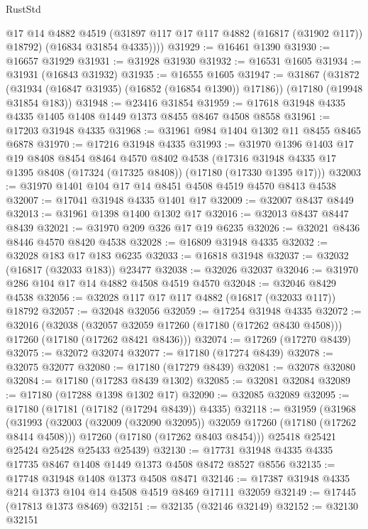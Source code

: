 \begin{lexlean}{RustStd}
\begin{coremodule}
{\begin{coremodule}
{{{{{{{{{{{{{{{{{{{{{{{{{{{{{{{{{{{{{{{{{{{{{{{{{{{{{{{          @17
          @14
          @4882
          @4519
          (@31897 @117 @17 @117 @4882 (@16817 (@31902 @117)) @18792)
          (@16834 @31854 @4335))))
@31929 := @16461 @1390
@31930 := @16657 @31929
@31931 := @31928 @31930
@31932 := @16531 @1605
@31934 := @31931 (@16843 @31932)
@31935 := @16555 @1605
@31947 := @31867
    (@31872 (@31934 (@16847 @31935) (@16852 (@16854 @1390)) @17186))
    (@17180 (@19948 @31854 @183))
@31948 := @23416 @31854
@31959 := @17618 @31948 @4335 @4335 @1405 @1408 @1449 @1373 @8455 @8467 @4508 @8558
@31961 := @17203 @31948 @4335
@31968 := @31961 @984 @1404 @1302 @11 @8455 @8465 @6878
@31970 := @17216 @31948 @4335
@31993 := @31970
    @1396
    @1403
    @17
    @19
    @8408
    @8454
    @8464
    @4570
    @8402
    @4538
    (@17316 @31948 @4335 @17 @1395 @8408 (@17324 (@17325 @8408)) (@17180 (@17330 @1395 @17)))
@32003 := @31970 @1401 @104 @17 @14 @8451 @4508 @4519 @4570 @8413 @4538
@32007 := @17041 @31948 @4335 @1401 @17
@32009 := @32007 @8437 @8449
@32013 := @31961 @1398 @1400 @1302 @17
@32016 := @32013 @8437 @8447 @8439
@32021 := @31970 @209 @326 @17 @19 @6235
@32026 := @32021 @8436 @8446 @4570 @8420 @4538
@32028 := @16809 @31948 @4335
@32032 := @32028 @183 @17 @183 @6235
@32033 := @16818 @31948
@32037 := @32032 (@16817 (@32033 @183)) @23477
@32038 := @32026 @32037
@32046 := @31970 @286 @104 @17 @14 @4882 @4508 @4519 @4570
@32048 := @32046 @8429 @4538
@32056 := @32028 @117 @17 @117 @4882 (@16817 (@32033 @117)) @18792
@32057 := @32048 @32056
@32059 := @17254 @31948 @4335
@32072 := @32016
    (@32038
      (@32057 @32059 @17260 (@17180 (@17262 @8430 @4508)))
      @17260
      (@17180 (@17262 @8421 @8436)))
@32074 := @17269 (@17270 @8439)
@32075 := @32072 @32074
@32077 := @17180 (@17274 @8439)
@32078 := @32075 @32077
@32080 := @17180 (@17279 @8439)
@32081 := @32078 @32080
@32084 := @17180 (@17283 @8439 @1302)
@32085 := @32081 @32084
@32089 := @17180 (@17288 @1398 @1302 @17)
@32090 := @32085 @32089
@32095 := @17180 (@17181 (@17182 (@17294 @8439)) @4335)
@32118 := @31959
    (@31968
      (@31993
        (@32003 (@32009 (@32090 @32095)) @32059 @17260 (@17180 (@17262 @8414 @4508)))
        @17260
        (@17180 (@17262 @8403 @8454)))
      @25418
      @25421
      @25424
      @25428
      @25433
      @25439)
@32130 := @17731 @31948 @4335 @4335 @17735 @8467 @1408 @1449 @1373 @4508 @8472 @8527 @8556
@32135 := @17748 @31948 @1408 @1373 @4508 @8471
@32146 := @17387 @31948 @4335 @214 @1373 @104 @14 @4508 @4519 @8469 @17111 @32059
@32149 := @17445 (@17813 @1373 @8469)
@32151 := @32135 (@32146 @32149)
@32152 := @32130 @32151
}}}}}}}}}}}}}}}}}}}}}}}}}}}}}}}}}}}}}}}}}}}}}}}}}}}}}}}
\end{coremodule}}
\end{coremodule}
\end{lexlean}
